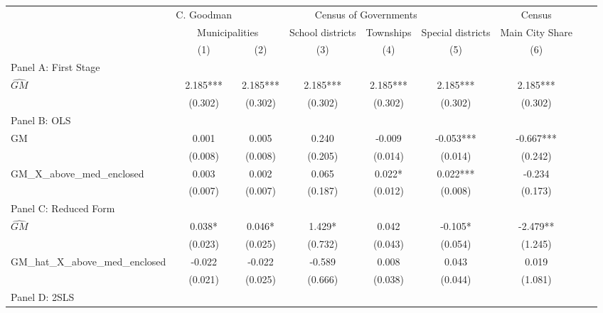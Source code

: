  \begin{tabular}{l*{8}{c}} \toprule
&\multicolumn{1}{c}{C. Goodman}&\multicolumn{4}{c}{Census of Governments}&\multicolumn{1}{c}{Census}\\\cmidrule(lr){2-2}\cmidrule(lr){3-6}\cmidrule(lr){7-7}
&\multicolumn{2}{c}{Municipalities}&\multicolumn{1}{c}{School districts}&\multicolumn{1}{c}{Townships}&\multicolumn{1}{c}{Special districts}&\multicolumn{1}{c}{Main City Share}\\\cmidrule(lr){2-3}\cmidrule(lr){4-6}\cmidrule(lr){7-7}
&\multicolumn{1}{c}{(1)}&\multicolumn{1}{c}{(2)}&\multicolumn{1}{c}{(3)}&\multicolumn{1}{c}{(4)}&\multicolumn{1}{c}{(5)}&\multicolumn{1}{c}{(6)}\\
\cmidrule(lr){1-7}
\multicolumn{6}{l}{Panel A: First Stage}\\
\cmidrule(lr){1-7}
$\widehat{GM}$  &    2.185***&    2.185***&    2.185***&    2.185***&    2.185***&    2.185***\\
                &  (0.302)   &  (0.302)   &  (0.302)   &  (0.302)   &  (0.302)   &  (0.302)   \\
\cmidrule(lr){1-7}
\multicolumn{6}{l}{Panel B: OLS}\\
\cmidrule(lr){1-7}
GM              &    0.001   &    0.005   &    0.240   &   -0.009   &   -0.053***&   -0.667***\\
                &  (0.008)   &  (0.008)   &  (0.205)   &  (0.014)   &  (0.014)   &  (0.242)   \\
\addlinespace
GM\_X\_above\_med\_enclosed&    0.003   &    0.002   &    0.065   &    0.022*  &    0.022***&   -0.234   \\
                &  (0.007)   &  (0.007)   &  (0.187)   &  (0.012)   &  (0.008)   &  (0.173)   \\
\cmidrule(lr){1-7}
\multicolumn{6}{l}{Panel C: Reduced Form}\\
\cmidrule(lr){1-7}
$\widehat{GM}$  &    0.038*  &    0.046*  &    1.429*  &    0.042   &   -0.105*  &   -2.479** \\
                &  (0.023)   &  (0.025)   &  (0.732)   &  (0.043)   &  (0.054)   &  (1.245)   \\
\addlinespace
GM\_hat\_X\_above\_med\_enclosed&   -0.022   &   -0.022   &   -0.589   &    0.008   &    0.043   &    0.019   \\
                &  (0.021)   &  (0.025)   &  (0.666)   &  (0.038)   &  (0.044)   &  (1.081)   \\
\cmidrule(lr){1-7}
\multicolumn{6}{l}{Panel D: 2SLS}\\

\end{tabular}
